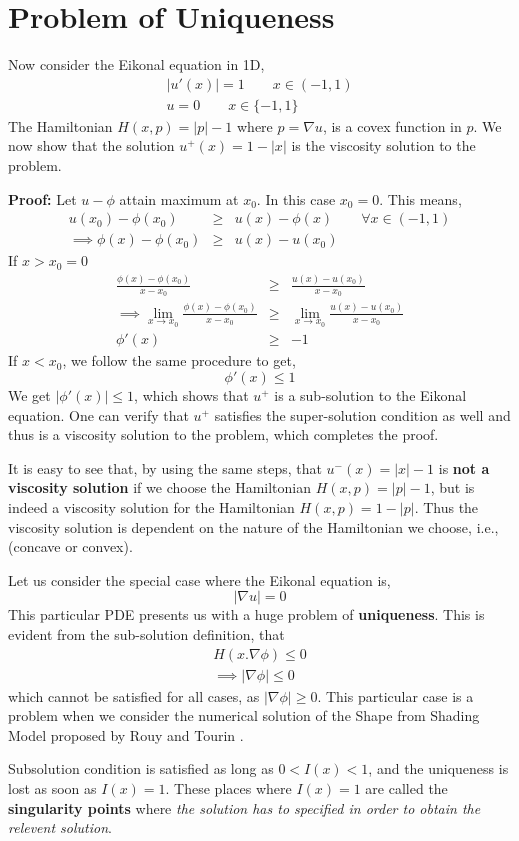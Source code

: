 \section{Problem of Uniqueness}
\noindent Now consider the Eikonal equation in 1D,
\begin{eqnarray}
	\lvert u'(x)\rvert = 1 \qquad x\in (-1,1)\\
	u = 0 \qquad x\in \{-1,1 \}
\end{eqnarray}
\noindent The Hamiltonian $H(x,p) = \lvert p\rvert -1$ where $p=\nabla u$, is a covex function in $p$. We now show that the solution $u^+(x) = 1 - \lvert x\rvert$ is the viscosity solution to the problem.

\noindent \textbf{Proof:} Let $u-\phi$ attain maximum at $x_0$. In this case $x_0 = 0$.
\noindent This means,
\begin{eqnarray}
	u(x_0) - \phi(x_0) &\ge& u(x) - \phi(x) \qquad \forall x\in (-1,1) \\
	\implies \phi(x) - \phi(x_0) &\ge& u(x) - u(x_0)
\end{eqnarray}
\noindent If $x>x_0 =0$
\begin{eqnarray}
	\frac{\phi(x) - \phi(x_0)}{x-x_0} &\ge& \frac{u(x)-u(x_0)}{x-x_0} \\
	\implies \lim_{x\to x_0} \frac{\phi(x) - \phi(x_0)}{x-x_0}& \ge& \lim_{x\to x_0}\frac{u(x)-u(x_0)}{x-x_0}\\
	\phi' (x) &\ge& -1
\end{eqnarray}
\noindent If $x<x_0$, we follow the same procedure to get,
\begin{equation}
	\phi'(x) \le 1
\end{equation}
\noindent We get $\lvert \phi'(x)\rvert \le 1$, which shows that $u^+$ is a sub-solution to the Eikonal equation. One can verify that $u^+$ satisfies the super-solution condition as well and thus is a viscosity solution to the problem, which completes the proof.

\noindent It is easy to see that, by using the same steps, that $u^-(x) = \lvert x\rvert -1$ is \textbf{not a viscosity solution} if we choose the Hamiltonian $ H(x,p) = \lvert p\rvert -1$, but is indeed a viscosity solution for the Hamiltonian $H(x,p) = 1 - \lvert p \rvert$. Thus the viscosity solution is dependent on the nature of the Hamiltonian we choose, i.e., (concave or convex).

\noindent Let us consider the special case where the Eikonal equation is,
\begin{equation}
	\lvert \nabla u\rvert = 0
\end{equation}
\noindent This particular PDE presents us with a huge problem of \textbf{uniqueness}. This is evident from the sub-solution definition, that
\begin{eqnarray}
	H(x.\nabla\phi) \le 0 \\
	\implies \lvert \nabla\phi\rvert \le 0
\end{eqnarray}
\noindent which cannot be satisfied for all cases, as $\lvert\nabla\phi\rvert \ge 0$. This particular case is a problem when we consider the numerical solution of the Shape from Shading Model proposed by Rouy and Tourin \cite{rouy}.

\noindent Subsolution condition is satisfied as long as $0 < I(x) < 1$, and the uniqueness is lost as soon as $I(x) = 1$. These places where $I(x) = 1$ are called the \textbf{singularity points} where \emph{the solution has to specified in order to obtain the relevent solution}.